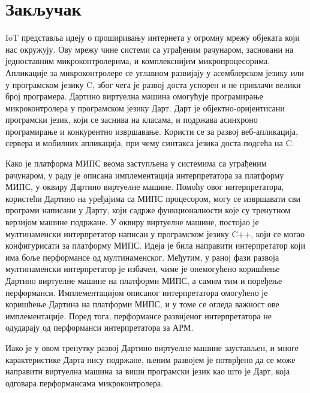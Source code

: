 \documentclass[12pt,oneside]{memoir}
\begin{document}
\chapter{Закључак}

IoT представља идеју о проширивању интернета у огромну мрежу објеката који нас окружују. Ову мрежу чине системи са уграђеним рачунаром, засновани на једноставним микроконтролерима, и комплекснијим микропроцесорима. Апликације за микроконтролере се углавном развијају у асемблерском језику или у програмском језику C, због чега је развој доста успорен и не привлачи велики број програмера. Дартино виртуелна машина омогућује програмирање микроконтролера у програмском језику Дарт. Дарт је објектно-оријентисани програмски језик, који се заснива на класама, и подржава асинхроно програмирање и конкурентно извршавање. Користи се за развој веб-апликација, сервера и мобилних апликација, при чему синтакса језика доста подсећа на C. 

Како је платформа МИПС веома заступљена у системима са уграђеним рачунаром, у раду је описана имплементација интерпретатора за платформу МИПС, у оквиру Дартино виртуелне машине. Помоћу овог интерпретатора, користећи Дартино на уређајима са МИПС процесором, могу се извршавати сви програми написани у Дарту, који садрже функционалности које су тренутном верзијом машине подржане. У оквиру виртуелне машине, постојао је мултинаменски интерпретатор написан у програмском језику C++, који се могао конфигурисати за платформу МИПС. Идеја је била направити интерпретатор који има боље перформансе од мултинаменског. Међутим, у раној фази развоја мултинаменски интерпретатор је избачен, чиме је онемогућено коришћење Дартино виртуелне машине на платформи МИПС, а самим тим и поређење перформанси. Имплементацијом описаног интерпретатора омогућено је коришћење Дартина на платформи МИПС, и у томе се огледа важност ове имплементације. Поред тога, перформансе развијеног интерпретатора не одударају од перформанси интерпретатора за АРМ.

Иако је у овом тренутку развој Дартино виртуелне машине заустављен, и многе карактеристике Дарта нису подржане, њеним развојем је потврђено да се може направити виртуелна машина за виши програмски језик као што је Дарт, која одговара перформансама микроконтролера. 



\literatura

\backmatter


\end{document}
